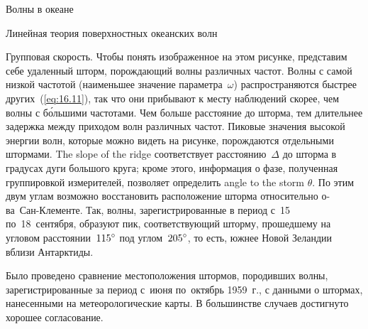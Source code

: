 \begin{chapter}{Волны в океане}
\begin{section}{Линейная теория поверхностных океанских волн}
\begin{paragraph}{Групповая скорость.}
Чтобы понять изображенное на этом рисунке, представим себе удаленный шторм,
порождающий волны различных частот. Волны с самой низкой частотой
(наименьшее значение параметра~$\omega$) распространяются быстрее 
других~(\ref{eq:16.11}), так что они прибывают к месту наблюдений скорее,
чем волны с б\'{о}льшими частотами. Чем больше расстояние до шторма,
тем длительнее задержка между приходом волн различных частот.
Пиковые значения высокой энергии волн, которые можно видеть на рисунке,
порождаются отдельными штормами. The slope of the ridge соответствует
расстоянию~$\Delta$ до шторма в градусах дуги большого круга; 
кроме этого, информация о фазе, полученная группировкой измерителей,
позволяет определить angle to the storm $\theta$. 
По этим двум углам возможно восстановить расположение шторма относительно
о-ва~Сан-Клементе. Так, волны, зарегистрированные в период с~15 по~18~сентября,
образуют пик, соответствующий шторму, прошедшему на угловом 
расстоянии~${115}^\circ$ под углом~${205}^\circ$, то есть,
южнее Новой Зеландии вблизи Антарктиды.
%

Было проведено сравнение местоположения штормов, породивших волны, 
зарегистрированные за период с~июня по~октябрь 1959~г., с данными о штормах,
нанесенными на метеорологические карты. В большинстве случаев достигнуто
хорошее согласование. 
%
\end{paragraph}


\end{section}
\end{chapter}
